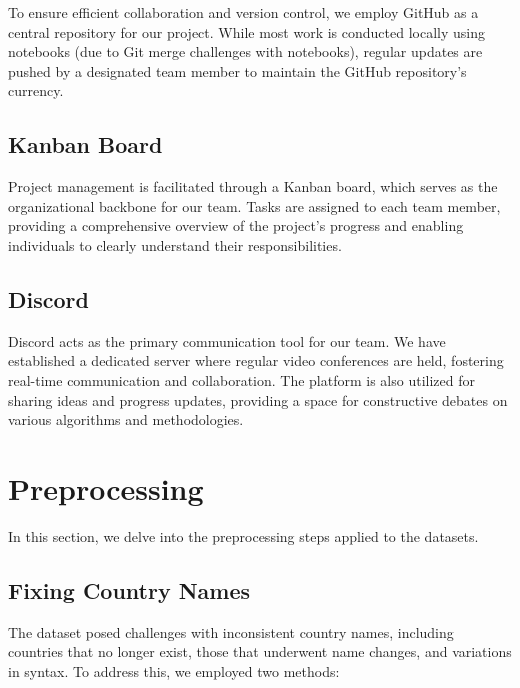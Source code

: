 \documentclass[a4paper,12pt]{article}
\begin{document}
To ensure efficient collaboration and version control, we employ GitHub as a central repository for our project. While most work is conducted locally using notebooks (due to Git merge challenges with notebooks), regular updates are pushed by a designated team member to maintain the GitHub repository's currency.

\subsection{Kanban Board} 

Project management is facilitated through a Kanban board, which serves as the organizational backbone for our team. Tasks are assigned to each team member, providing a comprehensive overview of the project's progress and enabling individuals to clearly understand their responsibilities.

\subsection{Discord} 

Discord acts as the primary communication tool for our team. We have established a dedicated server where regular video conferences are held, fostering real-time communication and collaboration. The platform is also utilized for sharing ideas and progress updates, providing a space for constructive debates on various algorithms and methodologies.

\section{Preprocessing}

In this section, we delve into the preprocessing steps applied to the datasets.

\subsection{Fixing Country Names}

The dataset posed challenges with inconsistent country names, including countries that no longer exist, those that underwent name changes, and variations in syntax. To address this, we employed two methods:\\
\end{document}
